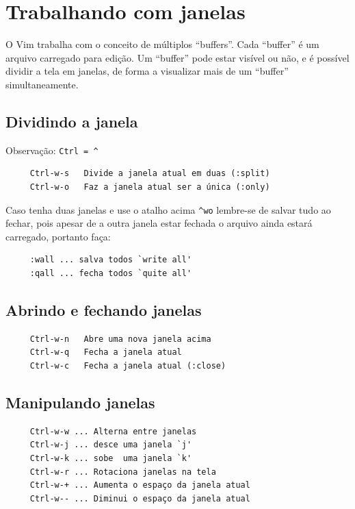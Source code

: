 \documentclass[10pt,a4paper,openany]{book}
\begin{document}
\chapter{Trabalhando com janelas}\label{cha:Trabalhando com janelas}

O Vim trabalha com o conceito de múltiplos ``buffers''. Cada
``buffer'' é um arquivo carregado para edição. Um ``buffer'' pode
estar visível ou não, e é possível dividir a tela em janelas, de forma
a visualizar mais de um ``buffer'' simultaneamente.

\section{Dividindo a janela }
Observação: \verb+Ctrl = ^+

\begin{verbatim}
     Ctrl-w-s   Divide a janela atual em duas (:split)
     Ctrl-w-o   Faz a janela atual ser a única (:only)
\end{verbatim}

Caso tenha duas janelas e use o atalho acima \verb|^wo| lembre-se de salvar
tudo ao fechar, pois apesar de a outra janela estar fechada o arquivo
ainda estará carregado, portanto faça:

\begin{verbatim}
     :wall ... salva todos `write all'
     :qall ... fecha todos `quite all'
\end{verbatim}

\section{Abrindo e fechando janelas }

\begin{verbatim}
     Ctrl-w-n   Abre uma nova janela acima
     Ctrl-w-q   Fecha a janela atual
     Ctrl-w-c   Fecha a janela atual (:close)
\end{verbatim}

\section{Manipulando janelas }

\begin{verbatim}
     Ctrl-w-w ... Alterna entre janelas
     Ctrl-w-j ... desce uma janela `j'
     Ctrl-w-k ... sobe  uma janela `k'
     Ctrl-w-r ... Rotaciona janelas na tela
     Ctrl-w-+ ... Aumenta o espaço da janela atual
     Ctrl-w-- ... Diminui o espaço da janela atual
\end{verbatim}
\end{document}
